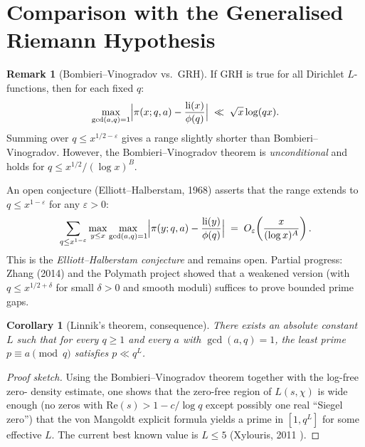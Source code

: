 \documentclass[12pt,a4paper]{amsart}
\newtheorem{corollary}[theorem]{Corollary}
\theoremstyle{definition}
\newtheorem{remark}[theorem]{Remark}
\DeclareMathOperator{\li}{li}
\begin{document}
\section{Comparison with the Generalised Riemann Hypothesis}

\begin{remark}[Bombieri--Vinogradov vs.\ GRH]
  If GRH is true for all Dirichlet $L$-functions, then for each fixed $q$:
  \[
    \max_{\gcd(a,q)=1}\Bigl|\pi(x;q,a)-\frac{\li(x)}{\phi(q)}\Bigr|
    \;\ll\;
    \sqrt{x}\log(qx).
  \]
  Summing over $q \leq x^{1/2-\varepsilon}$ gives a range slightly shorter
  than Bombieri--Vinogradov.  However, the Bombieri--Vinogradov theorem
  is \emph{unconditional} and holds for $q \leq x^{1/2}/(\log x)^B$.

  An open conjecture (Elliott--Halberstam, 1968) asserts that the
  range extends to $q \leq x^{1-\varepsilon}$ for any $\varepsilon > 0$:
  \[
    \sum_{q \leq x^{1-\varepsilon}}
    \max_{y \leq x}\max_{\gcd(a,q)=1}
    \Bigl|\pi(y;q,a)-\frac{\li(y)}{\phi(q)}\Bigr|
    \;=\; O_\varepsilon\!\left(\frac{x}{(\log x)^A}\right).
  \]
  This is the \emph{Elliott--Halberstam conjecture} and remains open.
  Partial progress: Zhang (2014) and the Polymath project showed that a
  weakened version (with $q \leq x^{1/2+\delta}$ for small $\delta > 0$
  and smooth moduli) suffices to prove bounded prime gaps.
\end{remark}

\begin{corollary}[Linnik's theorem, consequence]\label{cor:linnik}
  There exists an absolute constant $L$ such that for every $q \geq 1$ and
  every $a$ with $\gcd(a,q)=1$, the least prime $p \equiv a \pmod q$
  satisfies $p \ll q^L$.
\end{corollary}

\begin{proof}[Proof sketch]
  Using the Bombieri--Vinogradov theorem together with the log-free zero-
  density estimate, one shows that the zero-free region of $L(s,\chi)$ is
  wide enough (no zeros with $\text{Re}(s) > 1 - c/\log q$ except possibly
  one real ``Siegel zero'') that the von Mangoldt explicit formula yields
  a prime in $[1, q^L]$ for some effective $L$.  The current best known
  value is $L \leq 5$ (Xylouris, 2011 \cite{Xylouris2011}).
\end{proof}
\end{document}
